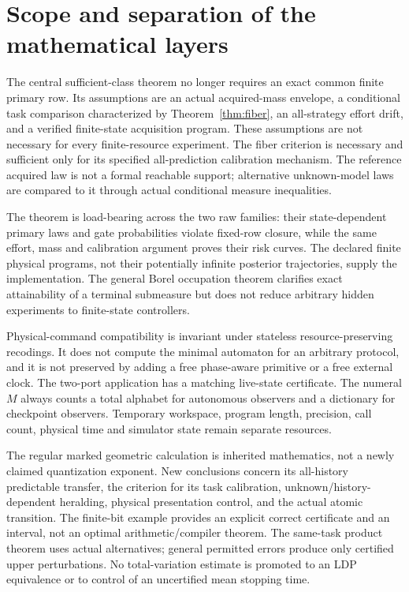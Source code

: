 \section{Scope and separation of the mathematical layers}
The central sufficient-class theorem no longer requires an exact common finite primary row. Its assumptions are an actual acquired-mass envelope, a conditional task comparison characterized by Theorem~\ref{thm:fiber}, an all-strategy effort drift, and a verified finite-state acquisition program. These assumptions are not necessary for every finite-resource experiment. The fiber criterion is necessary and sufficient only for its specified all-prediction calibration mechanism. The reference acquired law is not a formal reachable support; alternative unknown-model laws are compared to it through actual conditional measure inequalities.

The theorem is load-bearing across the two raw families: their state-dependent primary laws and gate probabilities violate fixed-row closure, while the same effort, mass and calibration argument proves their risk curves. The declared finite physical programs, not their potentially infinite posterior trajectories, supply the implementation. The general Borel occupation theorem clarifies exact attainability of a terminal submeasure but does not reduce arbitrary hidden experiments to finite-state controllers.

Physical-command compatibility is invariant under stateless resource-preserving recodings. It does not compute the minimal automaton for an arbitrary protocol, and it is not preserved by adding a free phase-aware primitive or a free external clock. The two-port application has a matching live-state certificate. The numeral $M$ always counts a total alphabet for autonomous observers and a dictionary for checkpoint observers. Temporary workspace, program length, precision, call count, physical time and simulator state remain separate resources.

The regular marked geometric calculation is inherited mathematics, not a newly claimed quantization exponent. New conclusions concern its all-history predictable transfer, the criterion for its task calibration, unknown/history-dependent heralding, physical presentation control, and the actual atomic transition. The finite-bit example provides an explicit correct certificate and an interval, not an optimal arithmetic/compiler theorem. The same-task product theorem uses actual alternatives; general permitted errors produce only certified upper perturbations. No total-variation estimate is promoted to an LDP equivalence or to control of an uncertified mean stopping time.

